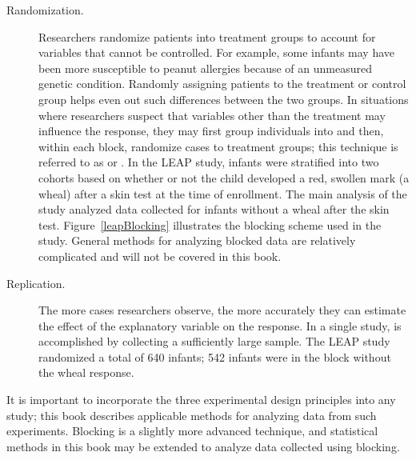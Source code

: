 \begin{doublespace}
\begin{description}
	\item[Randomization.] Researchers randomize patients into treatment groups to account for variables that cannot be controlled. For example, some infants may have been more susceptible to peanut allergies because of an unmeasured genetic condition. Randomly assigning patients to the treatment or control group helps even out such differences between the two groups. In situations where researchers suspect that variables other than the treatment may influence the response, they may first group individuals into  and then, within each block, randomize cases to treatment groups; this technique is referred to as  or .  In the LEAP study, infants were stratified into two cohorts based on whether or not the child developed a red, swollen mark (a wheal) after a skin test at the time of enrollment. The main analysis of the study analyzed data collected for infants without a wheal after the skin test. Figure~\ref{leapBlocking} illustrates the blocking scheme used in the study. General methods for analyzing blocked data are relatively complicated and will not be covered in this book.

	\item[Replication.] The more cases researchers observe, the more accurately they can estimate the effect of the explanatory variable on the response. In a single study,  is accomplished by collecting a sufficiently large sample. The LEAP study randomized a total of 640 infants; 542 infants were in the block without the wheal response. 

\end{description}

It is important to incorporate the three experimental design principles into any study; this book describes applicable methods for analyzing data from such experiments. Blocking is a slightly more advanced technique, and statistical methods in this book may be extended to analyze data collected using blocking.


\end{doublespace}
